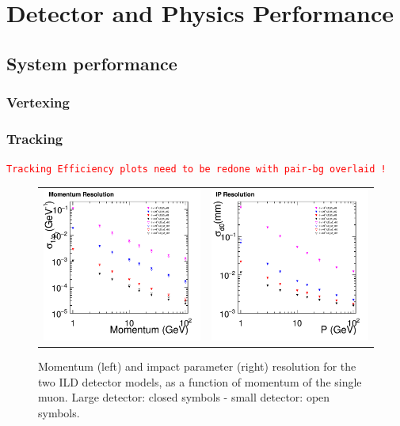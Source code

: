 \newcommand{\fix}[1]{\textcolor{red}{\texttt{#1}}} %

\chapter{Detector and Physics Performance}

\section{System performance}
\subsection{Vertexing}
\subsection{Tracking}

\fix{Tracking Efficiency plots need to be redone with pair-bg overlaid !}

%
% 
\begin{figure}[b!]
\begin{tabular}{cc}
\includegraphics[width=0.5\hsize]{Performance/fig/PResolution_ILD_ls5_v02.png} &
\includegraphics[width=0.5\hsize]{Performance/fig/IPResolution_ILD_ls5_v02.png}
\end{tabular}
\caption{\label{ild:fig:intro:tracking} Momentum (left) and impact parameter (right) resolution for the two ILD detector models,
  as a function of momentum of the single muon. Large detector: closed symbols - small detector: open symbols.}
\end{figure}


